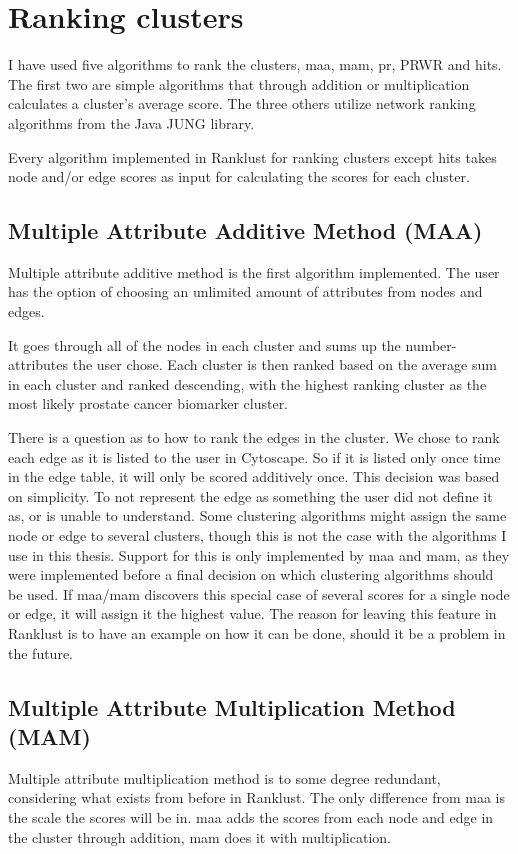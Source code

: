 \section{Ranking clusters}
I have used five algorithms to rank the clusters, \gls{maa}, \gls{mam},
\gls{pr}, PRWR and \gls{hits}. The first two are simple algorithms that through
addition or multiplication calculates a cluster's average score. The three
others utilize network ranking algorithms from the Java JUNG\cite{jung} library.

Every algorithm implemented in Ranklust for ranking clusters except \gls{hits}
takes node and/or edge scores as input for calculating the scores for each
cluster.

\subsection{Multiple Attribute Additive Method (MAA)}
Multiple attribute additive method is the first algorithm implemented.  The user
has the option of choosing an unlimited amount of attributes from nodes and
edges.

It goes through all of the nodes in each cluster and sums up the number-
attributes the user chose. Each cluster is then ranked based on the average sum
in each cluster and ranked descending, with the highest ranking cluster as the
most likely prostate cancer biomarker cluster.

There is a question as to how to rank the edges in the cluster. We chose to rank
each edge as it is listed to the user in Cytoscape. So if it is listed only once
time in the edge table, it will only be scored additively once. This decision
was based on simplicity. To not represent the edge as something the user did not
define it as, or is unable to understand. Some clustering algorithms might
assign the same node or edge to several clusters, though this is not the case
with the algorithms I use in this thesis. Support for this is only implemented
by \gls{maa} and \gls{mam}, as they were implemented before a final decision on
which clustering algorithms should be used. If \gls{maa}/\gls{mam} discovers
this special case of several scores for a single node or edge, it will assign it
the highest value.  The reason for leaving this feature in Ranklust is to have
an example on how it can be done, should it be a problem in the future.

\subsection{Multiple Attribute Multiplication Method (MAM)} Multiple attribute
multiplication method is to some degree redundant, considering what exists from
before in Ranklust. The only difference from \gls{maa} is the scale the scores
will be in. \gls{maa} adds the scores from each node and edge in the cluster
through addition, \gls{mam} does it with multiplication.

